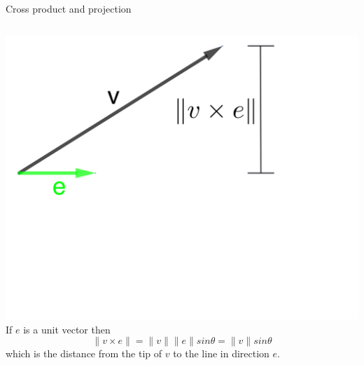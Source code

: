 \documentclass{beamer}
\begin{document}
\begin{frame}{Cross product and projection}
\begin{columns}
\hspace{-1.5cm}

	\includegraphics[scale=0.5]{cross-projection.png}
	If $e$ is a unit vector then
	\begin{equation*}
	\|v\times e\| = \|v\|\|e\| sin\theta = \|v\|sin\theta
	\end{equation*}
	which is the distance from the tip of $v$ to the line in direction $e$.
\end{columns}
\end{frame}
\end{document}
